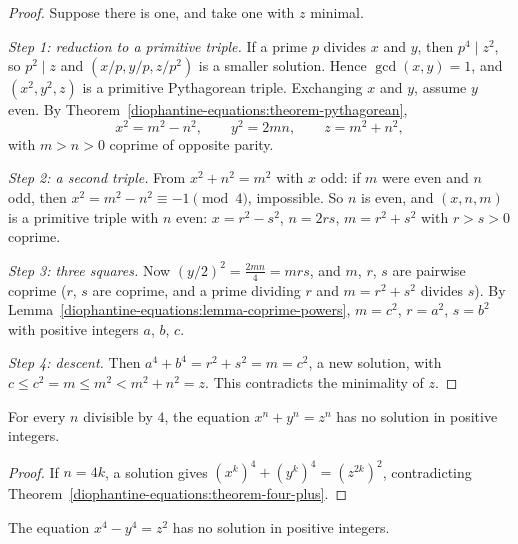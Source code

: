 \begin{proof}
Suppose there is one, and take one with $z$ minimal.

\emph{Step 1: reduction to a primitive triple.} If a prime $p$ divides $x$ and $y$, then $p^4 \mid z^2$, so $p^2 \mid z$ and $(x/p, y/p, z/p^2)$ is a smaller solution. Hence $\gcd(x, y) = 1$, and
$(x^2, y^2, z)$ is a primitive Pythagorean triple. Exchanging $x$ and $y$, assume $y$ even. By Theorem~\ref{diophantine-equations:theorem-pythagorean},
\[
x^2 = m^2 - n^2, \qquad y^2 = 2mn, \qquad z = m^2 + n^2,
\]
with $m > n > 0$ coprime of opposite parity.

\emph{Step 2: a second triple.} From $x^2 + n^2 = m^2$ with $x$ odd: if $m$ were even and $n$ odd, then $x^2 = m^2 - n^2 \equiv -1 \pmod 4$, impossible. So $n$ is even, and $(x, n, m)$ is a primitive triple
with $n$ even: $x = r^2 - s^2$, $n = 2rs$, $m = r^2 + s^2$ with $r > s > 0$ coprime.

\emph{Step 3: three squares.} Now $(y/2)^2 = \frac{2mn}{4} = mrs$, and $m$, $r$, $s$ are pairwise coprime ($r$, $s$ are coprime, and a prime dividing $r$ and $m = r^2 + s^2$ divides $s$). By
Lemma~\ref{diophantine-equations:lemma-coprime-powers}, $m = c^2$, $r = a^2$, $s = b^2$ with positive integers $a$, $b$, $c$.

\emph{Step 4: descent.} Then $a^4 + b^4 = r^2 + s^2 = m = c^2$, a new solution, with $c \leq c^2 = m \leq m^2 < m^2 + n^2 = z$. This contradicts the minimality of $z$.
\end{proof}

\begin{corollary}\label{diophantine-equations:corollary-flt-four}
For every $n$ divisible by $4$, the equation $x^n + y^n = z^n$ has no solution in positive integers.
\end{corollary}

\begin{proof}
If $n = 4k$, a solution gives $(x^k)^4 + (y^k)^4 = (z^{2k})^2$, contradicting Theorem~\ref{diophantine-equations:theorem-four-plus}.
\end{proof}

\begin{theorem}\label{diophantine-equations:theorem-four-minus}
The equation $x^4 - y^4 = z^2$ has no solution in positive integers.
\end{theorem}

